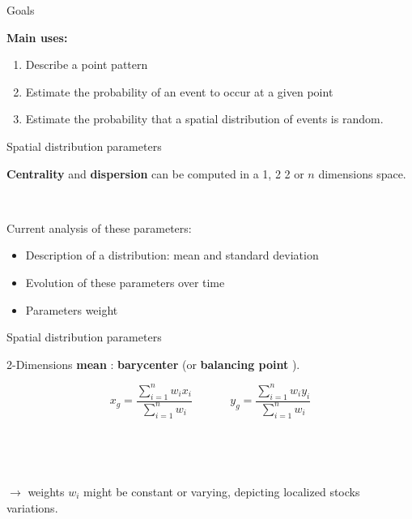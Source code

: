 \begin{frame}{Goals}

\textbf{Main uses:}

\begin{enumerate}
  \item Describe a point pattern 
  \item Estimate the probability of an event to occur at a given point
  \item Estimate the probability that a spatial distribution of events is random.
\end{enumerate}

\end{frame}


\begin{frame}{Spatial distribution parameters}

\textbf{Centrality} and \textbf{dispersion} can be computed in a 1, 2 2 or $n$ dimensions space. 

~

Current analysis of these parameters:

\begin{itemize}
\item Description of a distribution: mean and standard deviation
\item Evolution of these parameters over time
\item Parameters weight
\end{itemize}

\end{frame}


\begin{frame}{Spatial distribution parameters}

2-Dimensions \textbf{mean}  : \textbf{barycenter} (or \textbf{balancing point } ).

$$
x_g = \frac{\sum_{i=1}^n w_i x_i}{\sum_{i=1}^n w_i} ~~~~~~~~~~~~~~~ y_g = \frac{\sum_{i=1}^n w_i y_i}{\sum_{i=1}^n w_i}
$$

~

~

$\rightarrow$ weights $w_i$ might be constant or varying, depicting localized stocks variations.

\end{frame}



